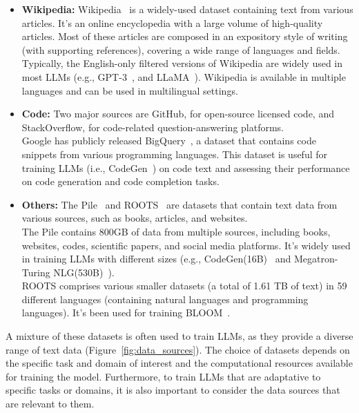 \begin{itemize}
{	      }
	\item \textbf{Wikipedia:} {
		      Wikipedia~\cite{wikipedia} is a widely-used dataset containing text from various articles. It's an online encyclopedia with a large volume of high-quality articles. Most of these articles are composed in an expository style of writing (with supporting references), covering a wide range of languages and fields.
		      Typically, the English-only filtered versions of Wikipedia are widely used in most LLMs (e.g., GPT-3~\cite{brown2020language}, and LLaMA~\cite{touvron2023llama}).
		      Wikipedia is available in multiple languages and can be used in multilingual settings.
	      }
	\item \textbf{Code:} {
		      Two major sources are GitHub, for open-source licensed code, and StackOverflow, for code-related question-answering platforms.\\
		      Google has publicly released BigQuery~\cite{bigquerydataset}, a dataset that contains code snippets from various programming languages. This dataset is useful for training LLMs (i.e., CodeGen~\cite{nijkamp2022codegen}) on code text and assessing their performance on code generation and code completion tasks.
	      }
	\item \textbf{Others:} {
		      The Pile~\cite{gao2021pile} and ROOTS~\cite{laurencon2022bigscience} are datasets that contain text data from various sources, such as books, articles, and websites.\\
		      The Pile contains 800GB of data from multiple sources, including books, websites, codes, scientific papers, and social media platforms. It's widely used in training LLMs with different sizes (e.g., CodeGen(16B)~\cite{nijkamp2022codegen} and Megatron-Turing NLG(530B)~\cite{smith2022deepspeed}).\\
		      ROOTS comprises various smaller datasets (a total of 1.61 TB of text) in 59 different languages (containing natural languages and programming languages). It's been used for training BLOOM~\cite{workshop2023bloom}.
	      }
\end{itemize}

A mixture of these datasets is often used to train LLMs, as they provide a diverse range of text data (Figure~\ref{fig:data_sources}).
The choice of datasets depends on the specific task and domain of interest and the computational resources available for training the model.
Furthermore, to train LLMs that are adaptative to specific tasks or domains, it is also important to consider the data sources that are relevant to them.\\


